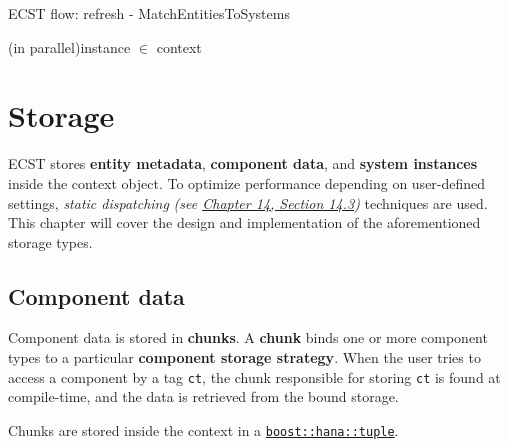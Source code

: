 \documentclass[twoside, 12pt, a4paper, openright]{book}
\begin{document}
\begin{algorithm}[H]

\caption{ECST flow: refresh - MatchEntitiesToSystems}
\footnotesize


    \ForEach(in parallel){instance \I $\in$ context \C}{
    }

\end{algorithm}

\chapter{Storage}\label{storage}

ECST stores \textbf{entity metadata}, \textbf{component data}, and
\textbf{system instances} inside the context object. To optimize
performance depending on user-defined settings, \emph{static
dispatching} \emph{(see
\protect\hyperlink{appendix_static_dispatching}{Chapter 14, Section
14.3})} techniques are used. This chapter will cover the design and
implementation of the aforementioned storage types.

\hypertarget{storage_component}{\section{Component
data}\label{storage_component}}

Component data is stored in \textbf{chunks}. A \textbf{chunk} binds one
or more component types to a particular \textbf{component storage
strategy}. When the user tries to access a component by a tag
\texttt{ct},
the chunk responsible for storing
\texttt{ct}
is found at compile-time, and the data is retrieved from the bound
storage.

Chunks are stored inside the context in a
\href{http://www.boost.org/doc/libs/1_61_0/libs/hana/doc/html/structboost_1_1hana_1_1tuple.html}{\texttt{boost::hana::tuple}}.
\end{document}
